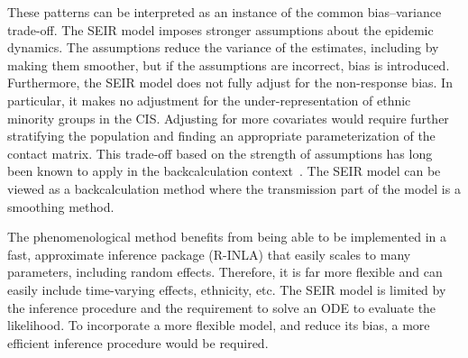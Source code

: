 \documentclass[thesis.tex]{subfiles}
\begin{document}
These patterns can be interpreted as an instance of the common bias--variance trade-off.
The SEIR model imposes stronger assumptions about the epidemic dynamics.
The assumptions reduce the variance of the estimates, including by making them smoother, but if the assumptions are incorrect, bias is introduced.
Furthermore, the SEIR model does not fully adjust for the non-response bias.
In particular, it makes no adjustment for the under-representation of ethnic minority groups in the CIS.
Adjusting for more covariates would require further stratifying the population and finding an appropriate parameterization of the contact matrix.
This trade-off based on the strength of assumptions has long been known to apply in the backcalculation context~\autocite[e.g.][section 8.3]{brookmeyerBackcalculation}.
The SEIR model can be viewed as a backcalculation method where the transmission part of the model is a smoothing method.

The phenomenological method benefits from being able to be implemented in a fast, approximate inference package (R-INLA) that easily scales to many parameters, including random effects.
Therefore, it is far more flexible and can easily include time-varying effects, ethnicity, etc.
The SEIR model is limited by the inference procedure and the requirement to solve an ODE to evaluate the likelihood.
To incorporate a more flexible model, and reduce its bias, a more efficient inference procedure would be required.
\end{document}
